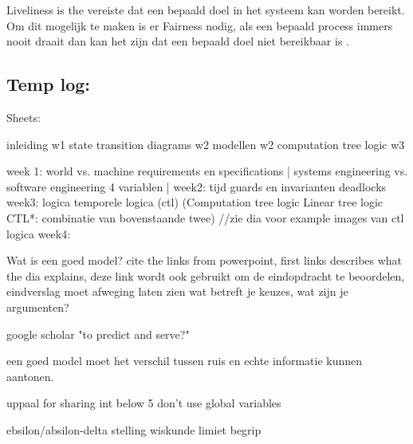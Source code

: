 \documentclass{article}
\begin{document}
Liveliness is the vereiste dat een bepaald doel in het systeem kan worden bereikt. Om dit mogelijk te maken is er Fairness nodig, als een bepaald process immers nooit draait dan kan het zijn dat een bepaald doel niet bereikbaar is \cite{fairnessandliveness}.

\newpage
\subsection{Temp log:}
Sheets:

inleiding w1
state transition diagrams w2
modellen w2
computation tree logic w3


week 1: 
world vs. machine
requirements en specifications |
systems engineering vs. software engineering
4 variablen |
week2:
tijd
guards en invarianten
deadlocks
week3:
logica
temporele logica (ctl)
(Computation tree logic
Linear tree logic
CTL*: combinatie van bovenstaande twee)
//zie dia voor example images van ctl logica
week4:




Wat is een goed model? cite the links from powerpoint, first links describes what the dia explains, deze link wordt ook gebruikt om de eindopdracht te beoordelen, eindverslag moet afweging laten zien wat betreft je keuzes, wat zijn je argumenten?

google scholar "to predict and serve?"

een goed model moet het verschil tussen ruis en echte informatie kunnen aantonen.

uppaal for sharing int below 5 don't use global variables

ebsilon/absilon-delta stelling wiskunde limiet begrip
\newpage


\end{document}
